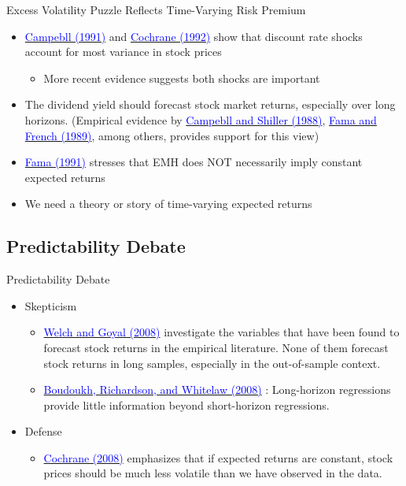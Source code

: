 \documentclass{beamer}
\begin{document}
\begin{frame}{Excess Volatility Puzzle Reflects Time-Varying Risk Premium}
	\begin{itemize}
		\item \href{https://doi.org/10.2307/2233809}{\textcolor{blue}{Campebll (1991)}} and \href{http://www.jstor.org/stable/2962031}{\textcolor{blue}{Cochrane (1992)}} show that discount rate shocks account for most variance in stock prices
		\begin{itemize}
			\item More recent evidence suggests both shocks are important
		\end{itemize}
		\item The dividend yield should forecast stock market returns, especially over long horizons. (Empirical evidence by  \href{https://doi.org/10.1093/rfs/1.3.195}{\textcolor{blue}{Campebll and Shiller (1988)}}, \href{http://www.sciencedirect.com/science/article/pii/0304405X89900950}{\textcolor{blue}{Fama and French (1989)}}, among others, provides support for this view)
		\item \href{https://doi.org/10.1111/j.1540-6261.1991.tb04636.x}{\textcolor{blue}{Fama (1991)}} stresses that EMH does NOT necessarily imply constant expected returns
		\item We need a theory or story of time-varying expected returns
	\end{itemize}
\end{frame}

\subsection{Predictability Debate}
\begin{frame}{Predictability Debate}
	\begin{itemize}
		\item Skepticism
		\begin{itemize}
			\item \href{http://www.jstor.org/stable/40056859}{\textcolor{blue}{Welch and Goyal (2008)}}   investigate the variables that have been found to forecast stock returns in the empirical literature. None of them forecast
			stock returns in long samples, especially in the out-of-sample context.
			\item \href{https://doi.org/10.1093/rfs/hhl042}{\textcolor{blue}{Boudoukh, Richardson, and Whitelaw (2008)}} : Long-horizon
			regressions provide little information beyond short-horizon regressions.
		\end{itemize}
		\item Defense
		\begin{itemize}
			\item \href{https://doi.org/10.1093/rfs/hhm046}{\textcolor{blue}{Cochrane (2008)}} emphasizes that if expected returns are constant, stock
			prices should be much less volatile than we have observed in the data.
		\end{itemize}
	\end{itemize}
\end{frame}
\end{document}
